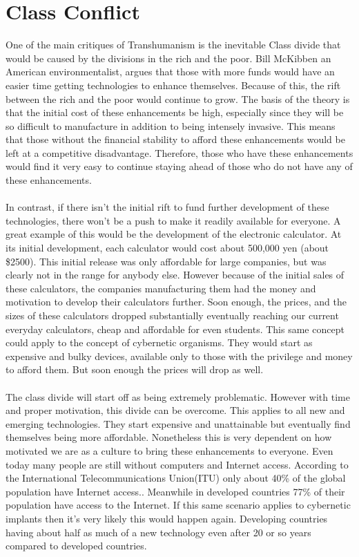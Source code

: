\documentclass[12pt,a4paper,notitlepage]{article}
\begin{document}
\section{Class Conflict}
One of the main critiques of Transhumanism is the inevitable Class divide that
would be caused by the divisions in the rich and the poor. Bill McKibben an
American environmentalist, argues that those with more funds would have an
easier time getting technologies to enhance themselves. Because of this, the
rift between the rich and the poor would continue to grow. The basis of the
theory is that the initial cost of these enhancements be high, especially since
they will be so difficult to manufacture in addition to being intensely invasive.
This means that those without the financial stability to afford these
enhancements would be left at a competitive disadvantage. Therefore, those who
have these enhancements would find it very easy to continue staying ahead of
those who do not have any of these enhancements.
\\\\
In contrast, if there isn't the initial rift to fund further development of
these technologies, there won't be a push to make it readily available for
everyone. A great example of this would be the development of the electronic
calculator. At its initial development, each calculator would cost about 500,000
yen (about \$2500). This initial release was only affordable for large
companies, but was clearly not in the range for anybody else. However because of
the initial sales of these calculators, the companies manufacturing them had the
money and motivation to develop their calculators further. Soon enough, the
prices, and the sizes of these calculators dropped substantially eventually
reaching our current everyday calculators, cheap and affordable for even
students. This same concept could apply to the concept of cybernetic organisms.
They would start as expensive and bulky devices, available only to those with
the privilege and money to afford them. But soon enough the prices will drop as
well.
\\\\
The class divide will start off as being extremely problematic. However with
time and proper motivation, this divide can be overcome. This applies to all new
and emerging technologies. They start expensive and unattainable but eventually
find themselves being more affordable. Nonetheless this is very dependent on how
motivated we are as a culture to bring these enhancements to everyone. Even
today many people are still without computers and Internet access. According to
the International Telecommunications Union(ITU) only about 40\% of the global
population have Internet access.\cite{itu}. Meanwhile in developed countries
77\% of their population have access to the Internet. If this same scenario
applies to cybernetic implants then it's very likely this would happen again.
Developing countries having about half as much of a new technology even after 20
or so years compared to developed countries.
\\
\end{document}
